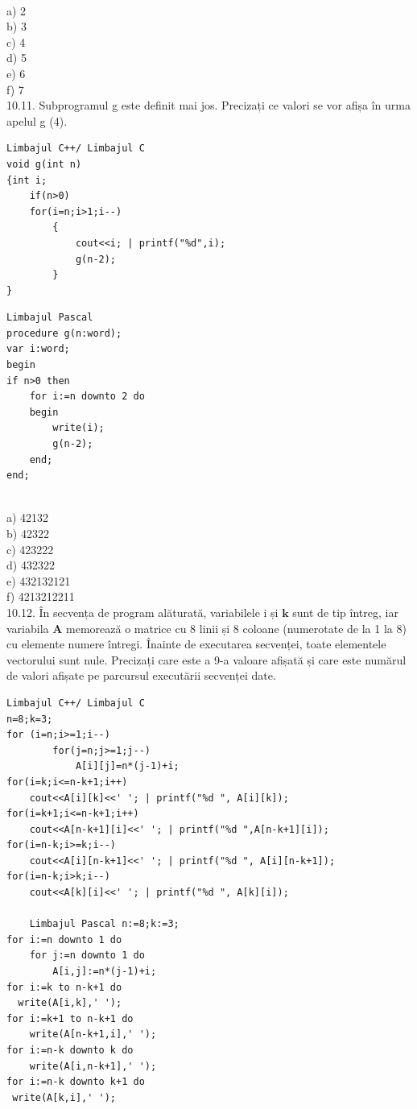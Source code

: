\\
a) 2
\\
b) 3
\\
c) 4
\\
d) 5
\\
e) 6
\\
f) 7
\\
10.11. Subprogramul g este definit mai jos. Precizați ce valori se vor afișa în urma apelul g (4).
\begin{verbatim}
Limbajul C++/ Limbajul C
void g(int n)
{int i;
    if(n>0)
    for(i=n;i>1;i--)
        {
            cout<<i; | printf("%d",i);
            g(n-2);
        }
}
\end{verbatim}
\begin{verbatim}
Limbajul Pascal
procedure g(n:word);
var i:word;
begin
if n>0 then
    for i:=n downto 2 do
    begin
        write(i);
        g(n-2);
    end;
end;
\end{verbatim}
\\
a) 42132
\\
b) 42322
\\
c) 423222
\\
d) 432322
\\
e) 432132121
\\
f) 4213212211
\\
10.12. În secvența de program alăturată, variabilele i și $\mathbf{k}$ sunt de tip întreg, iar variabila $\mathbf{A}$ memorează o matrice cu 8 linii și 8 coloane (numerotate de la 1 la 8) cu elemente numere întregi. Înainte de executarea secvenței, toate elementele vectorului sunt nule. Precizați care este a 9-a valoare afișată și care este numărul de valori afișate pe parcursul executării secvenței date.
\begin{verbatim}
Limbajul C++/ Limbajul C
n=8;k=3;
for (i=n;i>=1;i--)
        for(j=n;j>=1;j--)
            A[i][j]=n*(j-1)+i;
for(i=k;i<=n-k+1;i++)
    cout<<A[i][k]<<' '; | printf("%d ", A[i][k]);
for(i=k+1;i<=n-k+1;i++)
    cout<<A[n-k+1][i]<<' '; | printf("%d ",A[n-k+1][i]);
for(i=n-k;i>=k;i--)
    cout<<A[i][n-k+1]<<' '; | printf("%d ", A[i][n-k+1]);
for(i=n-k;i>k;i--)
    cout<<A[k][i]<<' '; | printf("%d ", A[k][i]);

    Limbajul Pascal n:=8;k:=3; 
for i:=n downto 1 do 
    for j:=n downto 1 do
        A[i,j]:=n*(j-1)+i; 
for i:=k to n-k+1 do 
  write(A[i,k],' '); 
for i:=k+1 to n-k+1 do  
    write(A[n-k+1,i],' '); 
for i:=n-k downto k do  
    write(A[i,n-k+1],' '); 
for i:=n-k downto k+1 do  
 write(A[k,i],' ');
\end{verbatim}
